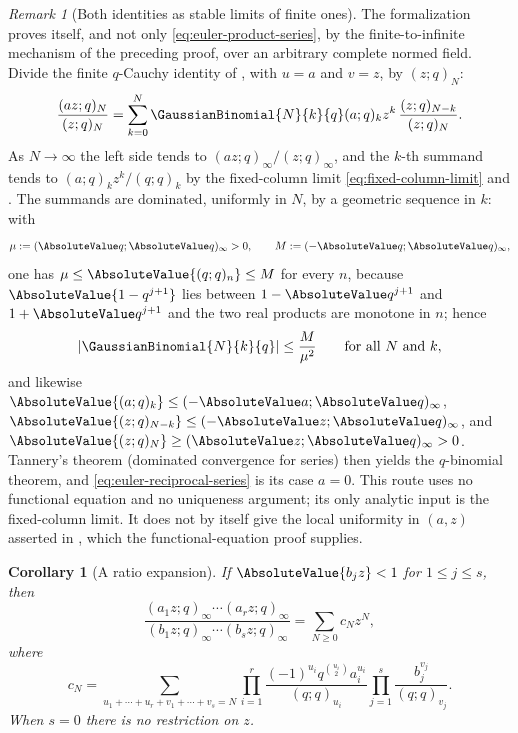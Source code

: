 \documentclass[11pt,a4paper,oneside,openany]{book}
\newtheorem{corollary}[corollary]{Corollary}
\theoremstyle{definition}
\theoremstyle{remark}
\newtheorem{remark}[remark]{Remark}
\begin{document}
\begin{remark}[Both identities as stable limits of finite ones]\label{rem:qbinomial-finite-route}
The formalization proves  itself, and not only \eqref{eq:euler-product-series}, by the finite-to-infinite mechanism of the preceding proof, over an arbitrary complete normed field.  Divide the finite $q$-Cauchy identity of , with $u=a$ and $v=z$, by $(z;q)_N$:
\[
 \frac{(az;q)_N}{(z;q)_N}
 =\sum_{k=0}^{N}\GaussianBinomial{N}{k}{q}(a;q)_k z^k\,\frac{(z;q)_{N-k}}{(z;q)_N}.
\]
As $N\to\infty$ the left side tends to $(az;q)_\infty/(z;q)_\infty$, and the $k$-th summand tends to $(a;q)_kz^k/(q;q)_k$ by the fixed-column limit \eqref{eq:fixed-column-limit} and .  The summands are dominated, uniformly in $N$, by a geometric sequence in $k$: with
\[
 \mu:=(\AbsoluteValue q;\AbsoluteValue q)_\infty>0,
 \qquad
 M:=(-\AbsoluteValue q;\AbsoluteValue q)_\infty,
\]
one has $\mu\le\AbsoluteValue{(q;q)_n}\le M$ for every $n$, because $\AbsoluteValue{1-q^{j+1}}$ lies between $1-\AbsoluteValue q^{j+1}$ and $1+\AbsoluteValue q^{j+1}$ and the two real products are monotone in $n$; hence
\[
 \left|\GaussianBinomial{N}{k}{q}\right|\le\frac{M}{\mu^2}
 \qquad\text{for all }N\text{ and }k,
\]
and likewise $\AbsoluteValue{(a;q)_k}\le(-\AbsoluteValue a;\AbsoluteValue q)_\infty$, $\AbsoluteValue{(z;q)_{N-k}}\le(-\AbsoluteValue z;\AbsoluteValue q)_\infty$, and $\AbsoluteValue{(z;q)_N}\ge(\AbsoluteValue z;\AbsoluteValue q)_\infty>0$.  Tannery's theorem (dominated convergence for series) then yields the $q$-binomial theorem, and \eqref{eq:euler-reciprocal-series} is its case $a=0$.  This route uses no functional equation and no uniqueness argument; its only analytic input is the fixed-column limit.  It does not by itself give the local uniformity in $(a,z)$ asserted in , which the functional-equation proof supplies.
\end{remark}

\begin{corollary}[A ratio expansion]\label{cor:ratio-expansion}
If $\AbsoluteValue{b_jz}<1$ for $1\le j\le s$, then
\[
 \frac{(a_1z;q)_\infty\cdots(a_rz;q)_\infty}
 {(b_1z;q)_\infty\cdots(b_sz;q)_\infty}
 =\sum_{N\ge0}c_Nz^N,
\]
where
\[
 c_N=\!\sum_{u_1+\cdots+u_r+v_1+\cdots+v_s=N}
 \prod_{i=1}^r
 \frac{(-1)^{u_i}q^{\binom{u_i}{2}}a_i^{u_i}}{(q;q)_{u_i}}
 \prod_{j=1}^s\frac{b_j^{v_j}}{(q;q)_{v_j}}.
\]
When $s=0$ there is no restriction on $z$.
\end{corollary}
\end{document}
